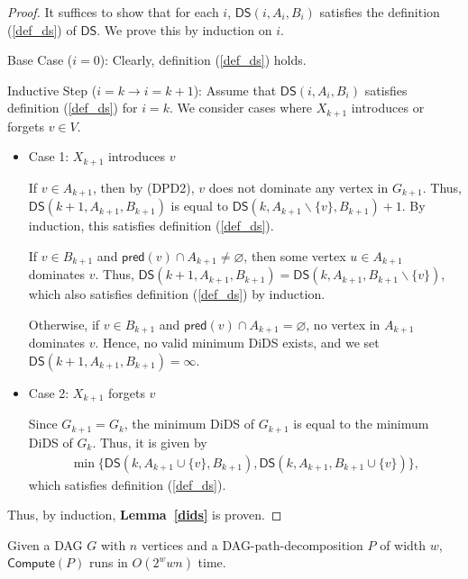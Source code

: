 \documentclass[runningheads]{llncs}
\theoremstyle{plain}
\theoremstyle{definition}
\begin{document}
\begin{proof}
    It suffices to show that for each $i$, $\mathsf{DS}(i, A_i, B_i)$ satisfies the definition (\ref{def_ds}) of $\mathsf{DS}$. We prove this by induction on $i$.
    
    Base Case ($i=0$): Clearly, definition (\ref{def_ds}) holds.
    
    Inductive Step ($i=k \rightarrow i=k+1$): Assume that $\mathsf{DS}(i, A_i, B_i)$ satisfies definition (\ref{def_ds}) for $i=k$. We consider cases where $X_{k+1}$ introduces or forgets $v \in V$.
    
    \begin{itemize}
        \item Case 1: $X_{k+1}$ introduces $v$
        
        If $v \in A_{k+1}$, then by (DPD2), $v$ does not dominate any vertex in $G_{k+1}$. Thus, $\mathsf{DS}(k+1, A_{k+1}, B_{k+1})$ is equal to $\mathsf{DS}(k, A_{k+1} \backslash \{v\}, B_{k+1}) + 1$. By induction, this satisfies definition (\ref{def_ds}).
        
        If $v \in B_{k+1}$ and $\mathsf{pred}(v) \cap A_{k+1} \neq \varnothing$, then some vertex $u \in A_{k+1}$ dominates $v$. Thus, $\mathsf{DS}(k+1, A_{k+1}, B_{k+1}) = \mathsf{DS}(k, A_{k+1}, B_{k+1} \backslash \{v\})$, which also satisfies definition (\ref{def_ds}) by induction.
        
        Otherwise, if $v \in B_{k+1}$ and $\mathsf{pred}(v) \cap A_{k+1} = \varnothing$, no vertex in $A_{k+1}$ dominates $v$. Hence, no valid minimum DiDS exists, and we set $\mathsf{DS}(k+1, A_{k+1}, B_{k+1}) = \infty$.
        
        \item Case 2: $X_{k+1}$ forgets $v$
        
        Since $G_{k+1} = G_k$, the minimum DiDS of $G_{k+1}$ is equal to the minimum DiDS of $G_k$. Thus, it is given by
        \begin{align*}
            \min \{\mathsf{DS}(k, A_{k+1} \cup \{v\}, B_{k+1}), \mathsf{DS}(k, A_{k+1}, B_{k+1} \cup \{v\})\},
        \end{align*}
        which satisfies definition (\ref{def_ds}).
    \end{itemize}
    Thus, by induction, \textbf{Lemma~\ref{dids}} is proven.
\end{proof}

\begin{lemma}
    Given a DAG $G$ with $n$ vertices and a DAG-path-decomposition $P$ of width $w$, $\mathsf{Compute}(P)$ runs in $O(2^w w n)$ time.
\end{lemma}
\end{document}
